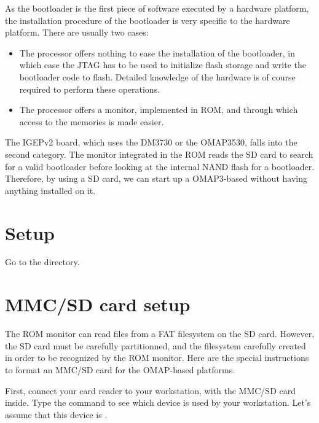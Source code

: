 
As the bootloader is the first piece of software executed by a
hardware platform, the installation procedure of the bootloader is
very specific to the hardware platform. There are usually two cases:

\begin{itemize}

\item The processor offers nothing to ease the installation of the
  bootloader, in which case the JTAG has to be used to initialize
  flash storage and write the bootloader code to flash. Detailed
  knowledge of the hardware is of course required to perform these
  operations.

\item The processor offers a monitor, implemented in ROM, and through
  which access to the memories is made easier.

\end{itemize}

The IGEPv2 board, which uses the DM3730 or the OMAP3530, falls into
the second category. The monitor integrated in the ROM reads the SD
card to search for a valid bootloader before looking at the internal
NAND flash for a bootloader. Therefore, by using a SD card, we can
start up a OMAP3-based without having anything installed on it.

\section{Setup}

Go to the  directory.

\section{MMC/SD card setup}

The ROM monitor can read files from a FAT filesystem on the SD
card. However, the SD card must be carefully partitionned, and the
filesystem carefully created in order to be recognized by the ROM
monitor. Here are the special instructions to format an MMC/SD card
for the OMAP-based platforms.

First, connect your card reader to your workstation, with the MMC/SD
card inside. Type the  command to see which device is used
by your workstation. Let's assume that this device is .

